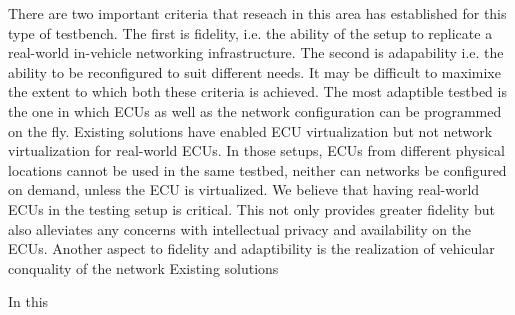 \documentclass[letterpaper,twocolumn,12pt]{article}
\begin{document}
There are two important criteria that reseach in this area has established for this type of testbench. The first is fidelity, i.e. the ability of the setup to replicate a real-world in-vehicle networking infrastructure. The second is adapability i.e. the ability to be reconfigured to suit different needs. It may be difficult to maximixe the extent to which both these criteria is achieved. The most adaptible testbed is the one in which ECUs as well as the network  configuration can be programmed on the fly. Existing solutions have enabled ECU virtualization but not network virtualization for real-world ECUs. In those setups, ECUs from different physical locations cannot be used in the same testbed, neither can networks be configured on demand, unless the ECU is virtualized.
We believe that having real-world ECUs in the testing setup is critical. This not only provides greater fidelity but also alleviates any concerns with intellectual privacy and availability on the ECUs. Another aspect to fidelity and adaptibility is the realization of vehicular conquality of the network 
Existing solutions 

In this 

\end{document}
